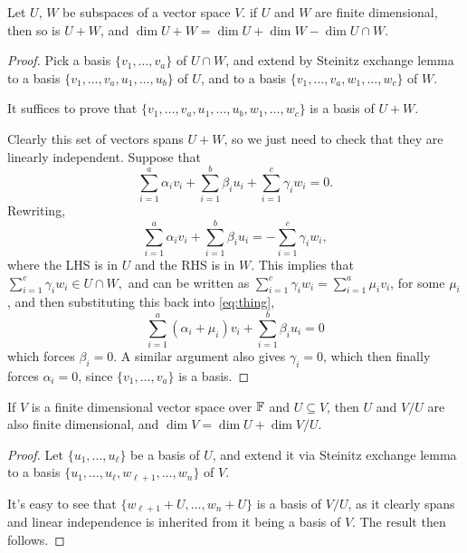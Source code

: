\documentclass[a4paper]{scrartcl}
\begin{document}
\begin{proposition}
    Let $U$, $W$ be subspaces of a vector space $V$. if $U$ and $W$ are finite dimensional, then so is $U + W$, and $\dim U + W = \dim U + \dim W - \dim U \cap W$.
\end{proposition}
\begin{proof}
    Pick a basis $\{v_1, \dots, v_a\}$ of $U \cap W$, and extend by Steinitz exchange lemma to a basis $\{v_1, \dots, v_a, u_1, \dots, u_b\}$ of $U$, and to a basis $\{v_1, \dots, v_a, w_1, \dots, w_c\}$ of $W$.
    
    It suffices to prove that $\{v_1, \dots, v_a, u_1, \dots, u_b, w_1, \dots, w_c\}$ is a basis of $U + W$.

    Clearly this set of vectors spans $U + W$, so we just need to check that they are linearly independent. Suppose that
    $$
    \sum_{i = 1}^{a} \alpha_i v_i + \sum_{i = 1}^b \beta_i u_i + \sum_{i = 1}^c \gamma_i w_i = 0.
    $$
    Rewriting,
    \begin{equation}\label{eq:thing}
        \sum_{i = 1}^{a} \alpha_i v_i + \sum_{i = 1}^b \beta_i u_i = -\sum_{i = 1}^c \gamma_i w_i, \tag{$\dagger$}
    \end{equation}
    where the LHS is in $U$ and the RHS is in $W$. This implies that
    $
    \sum_{i = 1}^c \gamma_i w_i \in U \cap W,
    $
    and can be written as 
    $
    \sum_{i = 1}^c \gamma_i w_i = \sum_{i = 1}^a  \mu_i v_i$,
    for some $\mu_i$, and then substituting this back into \eqref{eq:thing},
    $$
    \sum_{i = 1}^a (\alpha_i + \mu_i) v_i + \sum_{i = 1}^b \beta_i u_i = 0
    $$
    which forces $\beta_i = 0$. A similar argument also gives $\gamma_i = 0$, which then finally forces $\alpha_i = 0$, since $\{v_1, \dots, v_a\}$ is a basis.
\end{proof}

\begin{proposition}
    If $V$ is a finite dimensional vector space over $\mathbb{F}$ and $U \subseteq V$, then $U$ and $V / U$ are also finite dimensional, and $\dim V = \dim U + \dim V / U$.
\end{proposition}
\begin{proof}
    Let $\{u_1, \dots, u_\ell\}$ be a basis of $U$, and extend it via Steinitz exchange lemma to a basis $\{u_1, \dots, u_\ell, w_{\ell+1}, \dots, w_n\}$ of $V$.

    It's easy to see that $\{w_{\ell + 1} + U, \dots, w_{n} + U\}$ is a basis of $V/U$, as it clearly spans and linear independence is inherited from it being a basis of $V$. The result then follows.
\end{proof}
\end{document}
